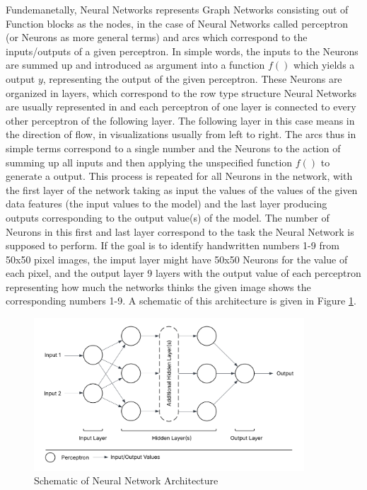Fundemanetally, Neural Networks represents Graph Networks consisting out of Function blocks as the nodes, in the case of Neural Networks called perceptron (or Neurons as more general terms) and arcs which correspond to the inputs/outputs of a given perceptron. In simple words, the inputs to the Neurons are summed up and introduced as argument into a function $f()$ which yields a output $y$, representing the output of the given perceptron. These Neurons are organized in layers, which correspond to the row type structure Neural Networks are usually represented in and each perceptron of one layer is connected to every other perceptron of the following layer. The following layer in this case means in the direction of flow, in visualizations usually from left to right. The arcs thus in simple terms correspond to a single number and the Neurons to the action of summing up all inputs and then applying the unspecified function $f()$ to generate a output. This process is repeated for all Neurons in the network, with the first layer of the network taking as input the values of the values of the given data features (the input values to the model) and the last layer producing outputs corresponding to the output value(s) of the model. The number of Neurons in this first and last layer correspond to the task the Neural Network is supposed to perform. If the goal is to identify handwritten numbers 1-9 from 50x50 pixel images, the imput layer might have 50x50 Neurons for the value of each pixel, and the output layer 9 layers with the output value of each perceptron representing how much the networks thinks the given image shows the corresponding numbers 1-9. A schematic of this architecture is given in Figure \ref{fig:neural_network_architecture}.

\begin{figure}[h] 
\centering
\includegraphics[width=0.9\textwidth]{figures/modelling/neural_network_concept.png} %
\caption{Schematic of Neural Network Architecture}
\label{fig:neural_network_architecture}
\end{figure}

